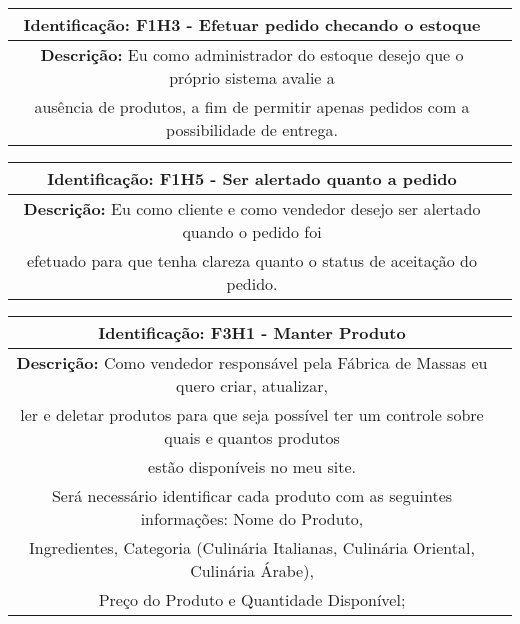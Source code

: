     \begin{table}[H]
    \centering
    \begin{tabular}{|c|p{10cm}}
    \hline
    \textbf{Identificação:} F1H3 - Efetuar pedido checando o estoque \\
    \hline
    \textbf{Descrição:} Eu como administrador do estoque desejo que o próprio sistema avalie a \\
    ausência de produtos, a fim de permitir apenas pedidos com a possibilidade de entrega. \\
    \hline
    \end{tabular}
    \end{table}

    \begin{table}[H]
    \centering
    \begin{tabular}{|c|p{10cm}}
    \hline
    \textbf{Identificação:} F1H5 - Ser alertado quanto a pedido \\
    \hline
    \textbf{Descrição:} Eu como cliente e como vendedor desejo ser alertado quando o pedido foi \\
    efetuado para que tenha clareza quanto o status de aceitação do pedido.\\
    \hline
    \end{tabular}
\end{table}

\begin{table}[H]
    \centering
    \begin{tabular}{|c|p{10cm}}
    \hline
    \textbf{Identificação:} F3H1 - Manter Produto \\
    \hline
    \textbf{Descrição:} Como vendedor responsável pela Fábrica de Massas eu quero criar, atualizar,\\
     ler e deletar produtos para que seja possível ter um controle sobre quais e quantos produtos \\
      estão disponíveis no meu site. \\
    Será necessário identificar cada produto com as seguintes informações: Nome do Produto, \\
    Ingredientes, Categoria (Culinária Italianas, Culinária Oriental, Culinária Árabe), \\
     Preço do Produto e Quantidade Disponível;\\
    \hline
        \end{tabular}
\end{table}

